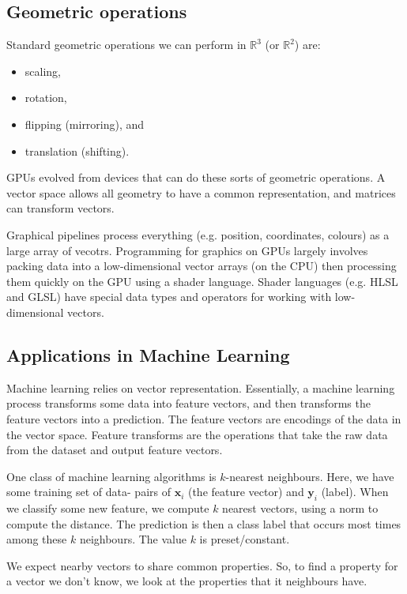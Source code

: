 \documentclass[a4paper, openany]{memoir}
\begin{document}
    \subsection{Geometric operations}
    Standard geometric operations we can perform in $\mathbb{R}^3$ (or $\mathbb{R}^2$) are:
    \begin{itemize}
        \item scaling,
        \item rotation,
        \item flipping (mirroring), and
        \item translation (shifting).
    \end{itemize}
    GPUs evolved from devices that can do these sorts of geometric operations. A vector space allows all geometry to have a common representation, and matrices can transform vectors.

    Graphical pipelines process everything (e.g. position, coordinates, colours) as a large array of vecotrs. Programming for graphics on GPUs largely involves packing data into a low-dimensional vector arrays (on the CPU) then processing them quickly on the GPU using a shader language. Shader languages (e.g. HLSL and GLSL) have special data types and operators for working with low-dimensional vectors.

    \subsection{Applications in Machine Learning}
    Machine learning relies on vector representation. Essentially, a machine learning process transforms some data into feature vectors, and then transforms the feature vectors into a prediction. The feature vectors are encodings of the data in the vector space. Feature transforms are the operations that take the raw data from the dataset and output feature vectors.

    One class of machine learning algorithms is $k$-nearest neighbours. Here, we have some training set of data- pairs of $\mathbf{x}_i$ (the feature vector) and $\mathbf{y}_i$ (label). When we classify some new feature, we compute $k$ nearest vectors, using a norm to compute the distance. The prediction is then a class label that occurs most times among these $k$ neighbours. The value $k$ is preset/constant.

    We expect nearby vectors to share common properties. So, to find a property for a vector we don't know, we look at the properties that it neighbours have.
\end{document}
